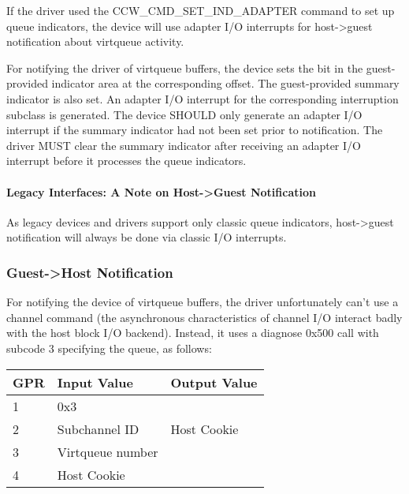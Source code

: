 If the driver used the CCW_CMD_SET_IND_ADAPTER command to set up
queue indicators, the device will use adapter I/O interrupts for
host->guest notification about virtqueue activity.

For notifying the driver of virtqueue buffers, the device sets the
bit in the guest-provided indicator area at the corresponding offset.
The guest-provided summary indicator is also set. An adapter I/O
interrupt for the corresponding interruption subclass is generated.
The device SHOULD only generate an adapter I/O interrupt if the
summary indicator had not been set prior to notification. The driver
MUST clear the summary indicator after receiving an adapter I/O
interrupt before it processes the queue indicators.

\paragraph{Legacy Interfaces: A Note on Host->Guest Notification}\label{sec:Virtio Transport Options / Virtio over channel I/O / Device Operation / Host->Guest Notification / Legacy Interfaces: A Note on Host->Guest Notification}

As legacy devices and drivers support only classic queue indicators,
host->guest notification will always be done via classic I/O interrupts.

\subsubsection{Guest->Host Notification}\label{sec:Virtio Transport Options / Virtio over channel I/O / Device Operation / Guest->Host Notification}

For notifying the device of virtqueue buffers, the driver
unfortunately can't use a channel command (the asynchronous
characteristics of channel I/O interact badly with the host block
I/O backend). Instead, it uses a diagnose 0x500 call with subcode
3 specifying the queue, as follows:

\begin{tabular}{ |l|l|l| }
\hline
GPR  &   Input Value     & Output Value \\
\hline \hline
  1   &       0x3         &              \\
\hline
  2   &  Subchannel ID    & Host Cookie  \\
\hline
  3   & Virtqueue number  &              \\
\hline
  4   &   Host Cookie     &              \\
\hline
\end{tabular}

